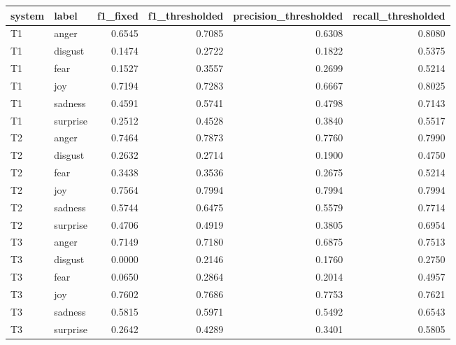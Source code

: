 \begin{tabular}{llrrrr}
\toprule
system & label & f1_fixed & f1_thresholded & precision_thresholded & recall_thresholded \\
\midrule
T1 & anger & 0.6545 & 0.7085 & 0.6308 & 0.8080 \\
T1 & disgust & 0.1474 & 0.2722 & 0.1822 & 0.5375 \\
T1 & fear & 0.1527 & 0.3557 & 0.2699 & 0.5214 \\
T1 & joy & 0.7194 & 0.7283 & 0.6667 & 0.8025 \\
T1 & sadness & 0.4591 & 0.5741 & 0.4798 & 0.7143 \\
T1 & surprise & 0.2512 & 0.4528 & 0.3840 & 0.5517 \\
T2 & anger & 0.7464 & 0.7873 & 0.7760 & 0.7990 \\
T2 & disgust & 0.2632 & 0.2714 & 0.1900 & 0.4750 \\
T2 & fear & 0.3438 & 0.3536 & 0.2675 & 0.5214 \\
T2 & joy & 0.7564 & 0.7994 & 0.7994 & 0.7994 \\
T2 & sadness & 0.5744 & 0.6475 & 0.5579 & 0.7714 \\
T2 & surprise & 0.4706 & 0.4919 & 0.3805 & 0.6954 \\
T3 & anger & 0.7149 & 0.7180 & 0.6875 & 0.7513 \\
T3 & disgust & 0.0000 & 0.2146 & 0.1760 & 0.2750 \\
T3 & fear & 0.0650 & 0.2864 & 0.2014 & 0.4957 \\
T3 & joy & 0.7602 & 0.7686 & 0.7753 & 0.7621 \\
T3 & sadness & 0.5815 & 0.5971 & 0.5492 & 0.6543 \\
T3 & surprise & 0.2642 & 0.4289 & 0.3401 & 0.5805 \\
\bottomrule
\end{tabular}
